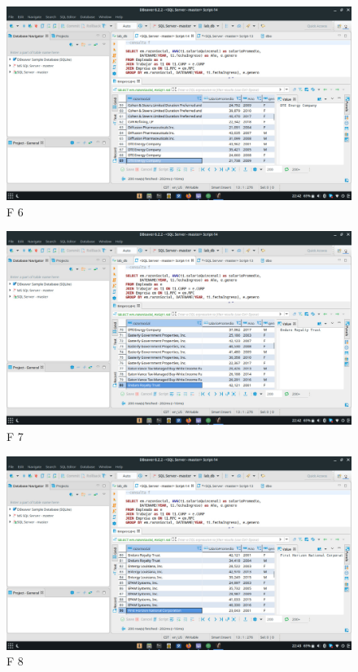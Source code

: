 \documentclass[a4paper, 12pt]{report}
\begin{document}
    \begin{figure}
        \includegraphics[width=\textwidth]
            {img/f6.jpeg}\hfill
    \caption{F 6}
    \end{figure}
    \begin{figure}
        \includegraphics[width=\textwidth]
            {img/f7.jpeg}\hfill
    \caption{F 7}
    \end{figure}
    \begin{figure}
        \includegraphics[width=\textwidth]
            {img/f8.jpeg}\hfill
    \caption{F 8}
    \end{figure}
\end{document}
